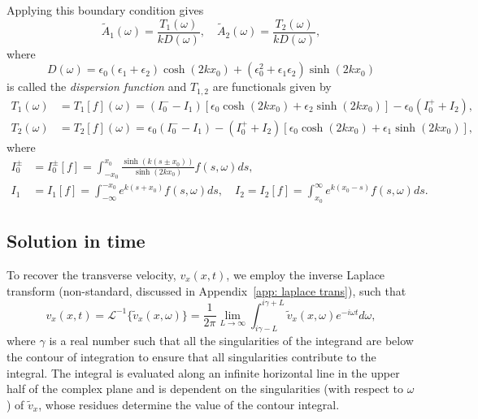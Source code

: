 \documentclass{aastex61}
\begin{document}
Applying this boundary condition gives
\begin{equation}
\tilde{A}_1(\omega) = \frac{T_1(\omega)}{k D(\omega)}, \quad \tilde{A}_2(\omega) = \frac{T_2(\omega)}{k D(\omega)},
\end{equation}
where
\begin{equation}
D(\omega) = \epsilon_0(\epsilon_1 + \epsilon_2)\cosh(2kx_0) + (\epsilon_0^2 + \epsilon_1\epsilon_2)\sinh(2kx_0)
\label{D incomp}
\end{equation}
is called the \textit{dispersion function} and $T_{1,2}$ are functionals given by
\begin{align}
T_1(\omega) &= T_1[f](\omega) = (I_0^- - I_1)[\epsilon_0\cosh(2kx_0) + \epsilon_2\sinh(2kx_0)] - \epsilon_0(I_0^+ + I_2), \\
T_2(\omega) &= T_2[f](\omega) = \epsilon_0(I_0^- - I_1) - (I_0^+ + I_2)[\epsilon_0\cosh(2kx_0) + \epsilon_1\sinh(2kx_0)],
\end{align}
where
\begin{align}
I_0^\pm &= I_0^\pm[f] = \int_{-x_0}^{x_0} \frac{\sinh(k(s \pm x_0))}{\sinh(2kx_0)} f(s, \omega) ds, \\
I_1 &= I_1[f] = \int_{-\infty}^{-x_0} e^{k(s + x_0)} f(s, \omega) ds,
\quad
I_2 = I_2[f] = \int_{x_0}^\infty e^{k(x_0 - s)} f(s, \omega) ds.
\end{align}


\subsection{Solution in time}

To recover the transverse velocity, $v_x(x, t)$, we employ the inverse Laplace transform (non-standard, discussed in Appendix~\ref{app: laplace trans}), such that
\begin{equation}
v_x(x,t) = \mathcal{L}^{-1}\{\tilde{v}_x(x, \omega)\} = \frac{1}{2\pi} \lim_{L \to \infty} \int_{i\gamma - L}^{i\gamma + L} \tilde{v}_x(x,\omega) e^{-i\omega t} d\omega,
\label{laplace transform}
\end{equation}
where $\gamma$ is a real number such that all the singularities of the integrand are below the contour of integration to ensure that all singularities contribute to the integral. The integral is evaluated along an infinite horizontal line in the upper half of the complex plane and is dependent on the singularities (with respect to $\omega$) of $\tilde{v}_x$, whose residues determine the value of the contour integral.
\end{document}
